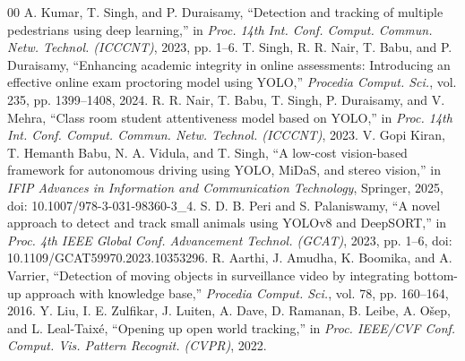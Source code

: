 \documentclass[conference]{IEEEtran}
\begin{document}
\begin{thebibliography}{00}
 A. Kumar, T. Singh, and P. Duraisamy, ``Detection and tracking of multiple pedestrians using deep learning,'' in \emph{Proc. 14th Int. Conf. Comput. Commun. Netw. Technol. (ICCCNT)}, 2023, pp. 1--6.
 T. Singh, R. R. Nair, T. Babu, and P. Duraisamy, ``Enhancing academic integrity in online assessments: Introducing an effective online exam proctoring model using YOLO,'' \emph{Procedia Comput. Sci.}, vol. 235, pp. 1399--1408, 2024.
 R. R. Nair, T. Babu, T. Singh, P. Duraisamy, and V. Mehra, ``Class room student attentiveness model based on YOLO,'' in \emph{Proc. 14th Int. Conf. Comput. Commun. Netw. Technol. (ICCCNT)}, 2023.
 V. Gopi Kiran, T. Hemanth Babu, N. A. Vidula, and T. Singh, ``A low-cost vision-based framework for autonomous driving using YOLO, MiDaS, and stereo vision,'' in \emph{IFIP Advances in Information and Communication Technology}, Springer, 2025, doi: 10.1007/978-3-031-98360-3\_4.
 S. D. B. Peri and S. Palaniswamy, ``A novel approach to detect and track small animals using YOLOv8 and DeepSORT,'' in \emph{Proc. 4th IEEE Global Conf. Advancement Technol. (GCAT)}, 2023, pp. 1--6, doi: 10.1109/GCAT59970.2023.10353296.
 R. Aarthi, J. Amudha, K. Boomika, and A. Varrier, ``Detection of moving objects in surveillance video by integrating bottom-up approach with knowledge base,'' \emph{Procedia Comput. Sci.}, vol. 78, pp. 160--164, 2016.
 Y. Liu, I. E. Zulfikar, J. Luiten, A. Dave, D. Ramanan, B. Leibe, A. O\v{s}ep, and L. Leal-Taix\'e, ``Opening up open world tracking,'' in \emph{Proc. IEEE/CVF Conf. Comput. Vis. Pattern Recognit. (CVPR)}, 2022.
\end{thebibliography}
\end{document}
